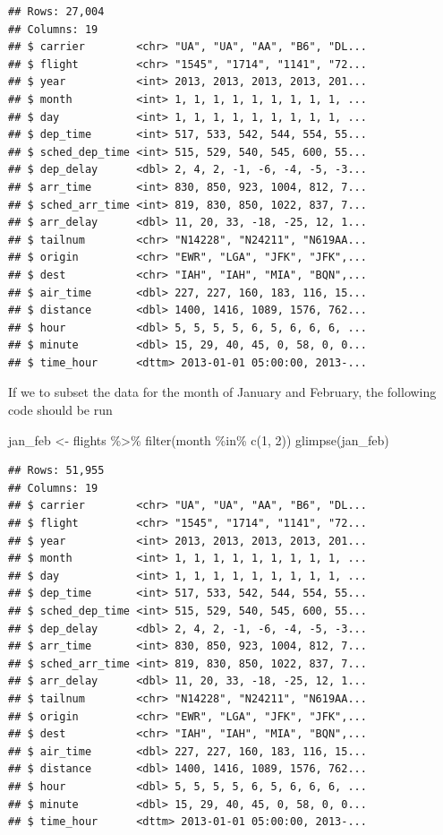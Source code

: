 \documentclass[
]{book}
\newenvironment{Shaded}{\begin{snugshade}}{\end{snugshade}}
\newcommand{\DecValTok}[1]{\textcolor[rgb]{0.00,0.00,0.81}{#1}}
\newcommand{\FunctionTok}[1]{\textcolor[rgb]{0.00,0.00,0.00}{#1}}
\newcommand{\NormalTok}[1]{#1}
\newcommand{\OtherTok}[1]{\textcolor[rgb]{0.56,0.35,0.01}{#1}}
\newcommand{\SpecialCharTok}[1]{\textcolor[rgb]{0.00,0.00,0.00}{#1}}
\begin{document}
\begin{verbatim}
## Rows: 27,004
## Columns: 19
## $ carrier        <chr> "UA", "UA", "AA", "B6", "DL...
## $ flight         <chr> "1545", "1714", "1141", "72...
## $ year           <int> 2013, 2013, 2013, 2013, 201...
## $ month          <int> 1, 1, 1, 1, 1, 1, 1, 1, 1, ...
## $ day            <int> 1, 1, 1, 1, 1, 1, 1, 1, 1, ...
## $ dep_time       <int> 517, 533, 542, 544, 554, 55...
## $ sched_dep_time <int> 515, 529, 540, 545, 600, 55...
## $ dep_delay      <dbl> 2, 4, 2, -1, -6, -4, -5, -3...
## $ arr_time       <int> 830, 850, 923, 1004, 812, 7...
## $ sched_arr_time <int> 819, 830, 850, 1022, 837, 7...
## $ arr_delay      <dbl> 11, 20, 33, -18, -25, 12, 1...
## $ tailnum        <chr> "N14228", "N24211", "N619AA...
## $ origin         <chr> "EWR", "LGA", "JFK", "JFK",...
## $ dest           <chr> "IAH", "IAH", "MIA", "BQN",...
## $ air_time       <dbl> 227, 227, 160, 183, 116, 15...
## $ distance       <dbl> 1400, 1416, 1089, 1576, 762...
## $ hour           <dbl> 5, 5, 5, 5, 6, 5, 6, 6, 6, ...
## $ minute         <dbl> 15, 29, 40, 45, 0, 58, 0, 0...
## $ time_hour      <dttm> 2013-01-01 05:00:00, 2013-...
\end{verbatim}

If we to subset the data for the month of January and February, the following code should be run

\begin{Shaded}
\begin{Highlighting}[]
\NormalTok{jan\_feb }\OtherTok{\textless{}{-}}\NormalTok{ flights }\SpecialCharTok{\%\textgreater{}\%} 
  \FunctionTok{filter}\NormalTok{(month }\SpecialCharTok{\%in\%} \FunctionTok{c}\NormalTok{(}\DecValTok{1}\NormalTok{, }\DecValTok{2}\NormalTok{))}
\FunctionTok{glimpse}\NormalTok{(jan\_feb)}
\end{Highlighting}
\end{Shaded}

\begin{verbatim}
## Rows: 51,955
## Columns: 19
## $ carrier        <chr> "UA", "UA", "AA", "B6", "DL...
## $ flight         <chr> "1545", "1714", "1141", "72...
## $ year           <int> 2013, 2013, 2013, 2013, 201...
## $ month          <int> 1, 1, 1, 1, 1, 1, 1, 1, 1, ...
## $ day            <int> 1, 1, 1, 1, 1, 1, 1, 1, 1, ...
## $ dep_time       <int> 517, 533, 542, 544, 554, 55...
## $ sched_dep_time <int> 515, 529, 540, 545, 600, 55...
## $ dep_delay      <dbl> 2, 4, 2, -1, -6, -4, -5, -3...
## $ arr_time       <int> 830, 850, 923, 1004, 812, 7...
## $ sched_arr_time <int> 819, 830, 850, 1022, 837, 7...
## $ arr_delay      <dbl> 11, 20, 33, -18, -25, 12, 1...
## $ tailnum        <chr> "N14228", "N24211", "N619AA...
## $ origin         <chr> "EWR", "LGA", "JFK", "JFK",...
## $ dest           <chr> "IAH", "IAH", "MIA", "BQN",...
## $ air_time       <dbl> 227, 227, 160, 183, 116, 15...
## $ distance       <dbl> 1400, 1416, 1089, 1576, 762...
## $ hour           <dbl> 5, 5, 5, 5, 6, 5, 6, 6, 6, ...
## $ minute         <dbl> 15, 29, 40, 45, 0, 58, 0, 0...
## $ time_hour      <dttm> 2013-01-01 05:00:00, 2013-...
\end{verbatim}
\end{document}
